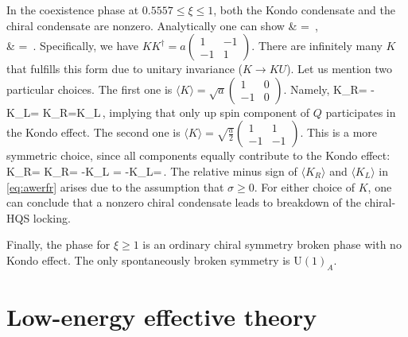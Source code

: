 \documentclass[aps,prd,longbibliography,reprint]{revtex4-2}
\newcommand{\U}{\text{U}}
\newcommand{\1}{\mathbbm{1}}
\newcommand{\up}{\uparrow}
\newcommand{\down}{\downarrow}
\def\ba#1\ea{\begin{align}#1\end{align}}
\begin{document}
In the coexistence phase at $0.5557\leq \xi \leq 1$, both the Kondo condensate and the chiral condensate are nonzero. Analytically one can show
\ba
	a & = \,,
	\label{eq:a_aesfd}
	\\
	\sigma & = \,.
	\label{eq:s_w23}
\ea
Specifically, we have $KK^\dagger=a\begin{pmatrix}1 & -1 \\ -1 & 1\end{pmatrix}$. There are infinitely many $K$ that fulfills this form due to unitary invariance ($K\to KU$). Let us mention two particular choices. The first one is $\langle K \rangle=\sqrt{a}\begin{pmatrix}1 & 0 \\ -1 & 0\end{pmatrix}$. Namely,
\ba
	\langle K_{R\up}\rangle = -\langle K_{L\up}\rangle =  \quad {} \quad 
	\langle K_{R\down}\rangle=\langle K_{L\down}\,,
\ea
implying that only up spin component of $Q$ participates in the Kondo effect. The second one is $\displaystyle \langle K \rangle=\sqrt{\frac{a}{2}}\begin{pmatrix}1 & 1 \\ -1 & -1 \end{pmatrix}$. This is a more symmetric choice, since all components equally contribute to the Kondo effect:
\ba
	\langle K_{R\up}\rangle = \langle K_{R\down}\rangle = -\langle K_{L\up}\rangle 
	= -\langle K_{L\down}\rangle=\,. 
	\label{eq:awerfr}
\ea
The relative minus sign of $\langle K_R\rangle$ and $\langle K_L\rangle$ in \eqref{eq:awerfr} arises due to the assumption that $\sigma\geq 0$. For either choice of $K$, one can conclude that a nonzero chiral condensate leads to breakdown of the chiral-HQS locking. 

Finally, the phase for $\xi\geq 1$ is an ordinary chiral symmetry broken phase with no Kondo effect. The only spontaneously broken symmetry is $\U(1)_A$. 


\section{\label{sc:eft}Low-energy effective theory}
\end{document}
